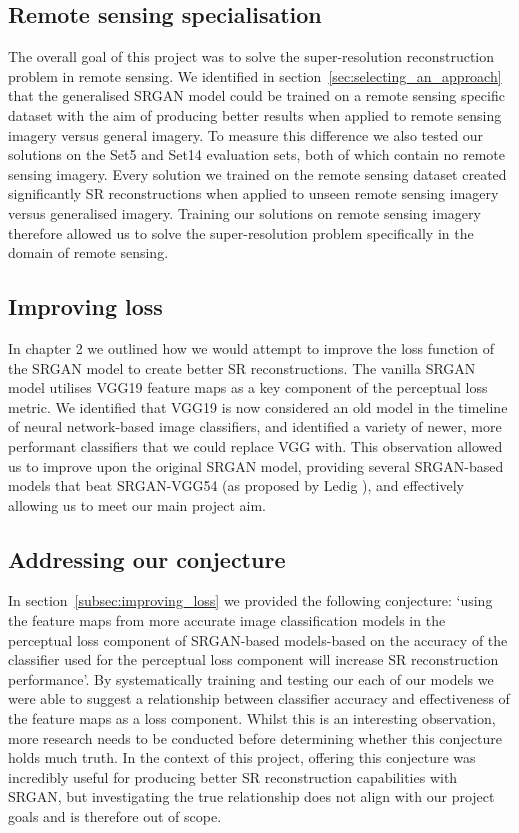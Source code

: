 \subsection{Remote sensing specialisation}
The overall goal of this project was to solve the super-resolution reconstruction problem in remote sensing. We identified in section~\ref{sec:selecting_an_approach} that the generalised SRGAN model could be trained on a remote sensing specific dataset with the aim of producing better results when applied to remote sensing imagery versus general imagery. To measure this difference we also tested our solutions on the Set5 and Set14 evaluation sets, both of which contain no remote sensing imagery. Every solution we trained on the remote sensing dataset created significantly SR reconstructions when applied to unseen remote sensing imagery versus generalised imagery. Training our solutions on remote sensing imagery therefore allowed us to solve the super-resolution problem specifically in the domain of remote sensing.

\subsection{Improving loss}
In chapter 2 we outlined how we would attempt to improve the loss function of the SRGAN model to create better SR reconstructions. The vanilla SRGAN model utilises VGG19 feature maps as a key component of the perceptual loss metric. We identified that VGG19 is now considered an old model in the timeline of neural network-based image classifiers, and identified a variety of newer, more performant classifiers that we could replace VGG with. This observation allowed us to improve upon the original SRGAN model, providing several SRGAN-based models that beat SRGAN-VGG54 (as proposed by Ledig \etal), and effectively allowing us to meet our main project aim.

\subsection{Addressing our conjecture}
In section~\ref{subsec:improving_loss} we provided the following conjecture: `using the feature maps from more accurate image classification models in the perceptual loss component of SRGAN-based models-based on the accuracy of the classifier used for the perceptual loss component will increase SR reconstruction performance'. By systematically training and testing our each of our models we were able to suggest a relationship between classifier accuracy and effectiveness of the feature maps as a loss component. Whilst this is an interesting observation, more research needs to be conducted before determining whether this conjecture holds much truth. In the context of this project, offering this conjecture was incredibly useful for producing better SR reconstruction capabilities with SRGAN, but investigating the true relationship does not align with our project goals and is therefore out of scope.

